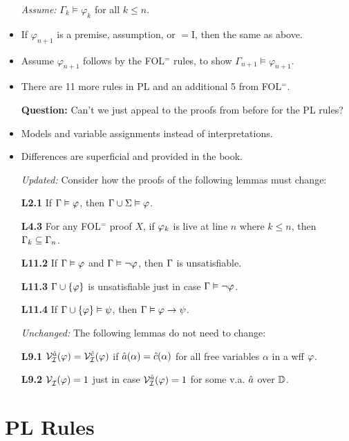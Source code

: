 \documentclass[a4paper, 11pt]{article} %
\begin{document}
\begin{itemize}
  \item[\it Assume:] $\Gamma_k \vDash \varphi_k$ for all $k\leq n$.
  \item If $\varphi_{n+1}$ is a premise, assumption, or $=$I, then the same as above. 
  \item Assume $\varphi_{n+1}$ follows by the FOL$^=$ rules, to show $\Gamma_{n+1}\vDash\varphi_{n+1}$.
  \item There are 11 more rules in PL and an additional 5 from FOL$^=$.
  \item[\bf Question:] Can't we just appeal to the proofs from before for the PL rules?
    \item Models and variable assignments instead of interpretations.
    \item Differences are superficial and provided in the book.
  \item[\it Updated:] Consider how the proofs of the following lemmas must change: 
    \item[\bf L2.1] If $\Gamma \vDash \varphi$, then $\Gamma \cup \Sigma \vDash \varphi$.
    \item[\bf L4.3] For any FOL$^=$ proof $X$, if $\varphi_k$ is live at line $n$ where $k\leq n$, then $\Gamma_k\subseteq \Gamma_{n}$.
    \item[\bf L11.2] If $\Gamma \vDash \varphi$ and $\Gamma \vDash \neg\varphi$, then $\Gamma$ is unsatisfiable.
    \item[\bf L11.3] $\Gamma \cup \lbrace\varphi\rbrace$ is unsatisfiable just in case $\Gamma \vDash \neg\varphi$.
    \item[\bf L11.4] If $\Gamma \cup \lbrace\varphi\rbrace \vDash \psi$, then $\Gamma \vDash \varphi \rightarrow \psi$.
  \item[\it Unchanged:] The following lemmas do not need to change:
  \item[\bf L9.1] $\mathcal{V}_{\mathcal{I}}^{\hat{a}}(\varphi)=\mathcal{V}_{\mathcal{I}}^{\hat{c}}(\varphi)$ if $\hat{a}(\alpha)=\hat{c}(\alpha)$ for all free variables $\alpha$ in a wff $\varphi$.
  \item[\bf L9.2] $\mathcal{V}_{\mathcal{I}}^{}(\varphi)= 1$ just in case $\mathcal{V}_{\mathcal{I}}^{\hat{a}}(\varphi)= 1$ for some v.a. $\hat{a}$ over $\mathbb{D}$.
\end{itemize}
\vspace{-.25in}





\section*{PL Rules}
\end{document}
